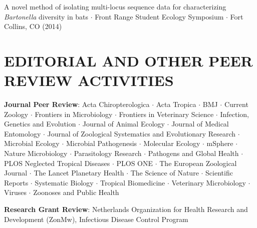 \documentclass{cv}
\begin{document}
A novel method of isolating multi-locus sequence data for characterizing \textit{Bartonella} diversity in bats $\cdot$ Front Range Student Ecology Symposium $\cdot$ Fort Collins, CO (2014)


\section*{EDITORIAL AND OTHER PEER REVIEW ACTIVITIES}

\textbf{Journal Peer Review}: Acta Chiropterologica $\cdot$ Acta Tropica $\cdot$ BMJ $\cdot$ Current Zoology $\cdot$ Frontiers in Microbiology $\cdot$ Frontiers in Veterinary Science $\cdot$ Infection, Genetics and Evolution $\cdot$ Journal of Animal Ecology $\cdot$ Journal of Medical Entomology $\cdot$ Journal of Zoological Systematics and Evolutionary Research $\cdot$ Microbial Ecology $\cdot$ Microbial Pathogenesis $\cdot$ Molecular Ecology $\cdot$ mSphere $\cdot$ Nature Microbiology $\cdot$ Parasitology Research $\cdot$ Pathogens and Global Health $\cdot$ PLOS Neglected Tropical Diseases $\cdot$ PLOS ONE $\cdot$ The European Zoological Journal $\cdot$ The Lancet Planetary Health $\cdot$ The Science of Nature $\cdot$ Scientific Reports $\cdot$ Systematic Biology $\cdot$ Tropical Biomedicine $\cdot$ Veterinary Microbiology $\cdot$ Viruses $\cdot$ Zoonoses and Public Health

\textbf{Research Grant Review}: Netherlands Organization for Health Research and Development (ZonMw), Infectious Disease Control Program




\end{document}
